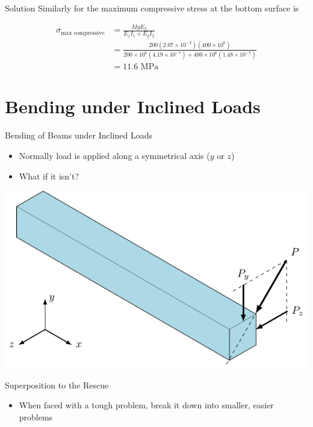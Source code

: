 \documentclass[10pt, svgnames]{beamer}
\begin{document}
\begin{frame}[label={sec:orgff822ef}]{Solution}
Similarly for the maximum compressive stress at the bottom surface is

\begin{align*}
  \sigma_{\max \text{ compressive}} &= \frac{MyE_2}{E_1I_1 + E_2I_2} \\
                                 &= \frac{200(2.07 \times 10^{ - 2})(400 \times 10^6)}{200 \times 10^6(4.19 \times 10^{-7}) + 400 \times 10^6(1.48 \times 10^{-7})} \\
                                 &= 11.6 \text{ MPa}
\end{align*}
\end{frame}

\section{Bending under Inclined Loads}
\label{bending-under-inclined-loads}
\begin{frame}[label={sec:orgf6d4e39}]{Bending of Beams under Inclined Loads}
\begin{itemize}
\item Normally load is applied along a symmetrical axis (\(y\) or \(z\))

\item What if it isn't?
\end{itemize}

\begin{center}
\includegraphics[width=.9\linewidth]{pictures/inclined-loads.pdf}
\end{center}
\end{frame}

\begin{frame}[label={sec:org6e2f022}]{Superposition to the Rescue}
\begin{itemize}
\item When faced with a tough problem, break it down into smaller, easier
problems
\end{itemize}
\end{frame}
\end{document}
